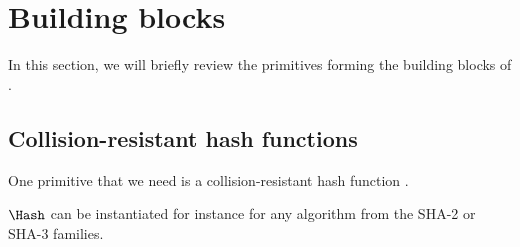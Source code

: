 \section{Building blocks}%
\label{Primitives}\label{BuildingBlocks}

In this section, we will briefly review the primitives forming the building blocks of \PRIVO.

\subsection{Collision-resistant hash functions}


One primitive that we need is a collision-resistant hash function \Hash.


\(\Hash\) can be instantiated for instance for any algorithm from the SHA-2 or SHA-3 families.











